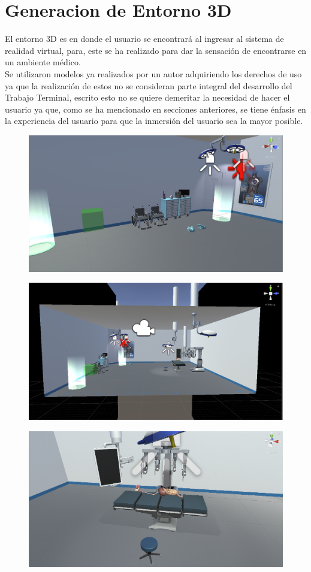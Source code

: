 \section{Generacion de Entorno 3D}
El entorno 3D es en donde el usuario se encontrará al ingresar al sistema de realidad virtual, para, este se ha realizado para dar la sensación de encontrarse en un ambiente médico.\\
Se utilizaron modelos ya realizados por un autor adquiriendo los derechos de uso ya que la realización de estos no se consideran parte integral del desarrollo del Trabajo Terminal, 
escrito esto no se quiere demeritar la necesidad de hacer el usuario ya que, como se ha mencionado en secciones anteriores, se tiene énfasis en la experiencia del usuario para que 
la inmersión del usuario sea la mayor posible.\\
\begin{figure}[H]
	\begin{center}
 		\includegraphics[width = .5\textwidth]{source/images/image63.png}
	\end{center} 
\end{figure}

\begin{figure}[H]
	\begin{center}
 		\includegraphics[width = .5\textwidth]{source/images/image53.png}
	\end{center} 
\end{figure}

\begin{figure}[H]
	\begin{center}
 		\includegraphics[width = .5\textwidth]{source/images/image16.png}
	\end{center} 
\end{figure}


